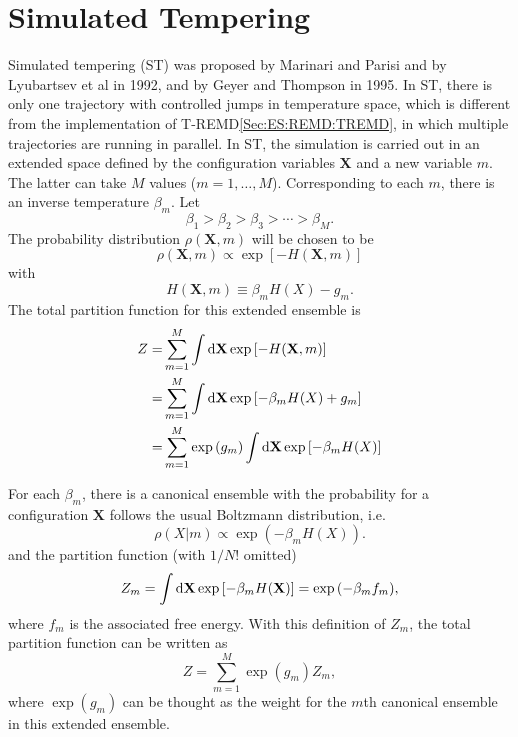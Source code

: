 \section{Simulated Tempering\label{Sec:ES:ST}}
Simulated tempering (ST) was proposed by Marinari and Parisi\cite{MarinariEPL1992} and by Lyubartsev et al\cite{LyubartsevJCP1992} in 1992, and by Geyer and Thompson\cite{GeyerJASA1995} in 1995. In ST, there is only one trajectory with controlled jumps in temperature space, which is different from the implementation of T-REMD\ref{Sec:ES:REMD:TREMD}, in which multiple trajectories are running in parallel. In ST, the simulation is carried out in an extended space defined by the configuration variables $\mathbf{X}$ and a new variable $m$. The latter can take $M$ values ($m=1,\dots,M$). Corresponding to each $m$, there is an inverse temperature $\beta_m$. Let
\begin{equation}
    \beta_1>\beta_2>\beta_3>\cdots >\beta_M.
\end{equation}
The probability distribution $\rho(\mathbf{X},m)$ will be chosen to be 
\begin{equation}
  \rho(\mathbf{X},m)\propto \exp{\left[-H(\mathbf{X},m)\right]}
\end{equation}
with 
\begin{equation}
  H(\mathbf{X},m)\equiv \beta_m H(X)-g_m.
\end{equation}
The total partition function for this extended ensemble is
\begin{align}
    Z=&\sum_{m=1}^M \int\mathop{}\!\mathrm{d} \mathbf{X} \exp{\left[-H(\mathbf{X},m)\right]}\notag\\
     =&\sum_{m=1}^M \int\mathop{}\!\mathrm{d} \mathbf{X} \exp{\left[-\beta_m H(X)+g_m\right]}\notag\\
     =&\sum_{m=1}^M \exp{(g_m)}\int\mathop{}\!\mathrm{d} \mathbf{X} \exp{\left[-\beta_m H(X)\right]}
\end{align}

For each $\beta_m$, there is a canonical ensemble with the probability for a configuration $\mathbf{X}$ follows the usual Boltzmann distribution, i.e. 
\begin{equation}
    \rho(X|m)\propto \exp{(-\beta_m H(X))}.
\end{equation}
and the partition function (with $1/N!$ omitted)
\begin{equation}
    Z_m=\int \mathop{}\!\mathrm{d} \mathbf{X} \exp{[-\beta_m H(\mathbf{X})]}=\exp{(-\beta_m f_m)},
\end{equation}
where $f_m$ is the associated free energy. With this definition of $Z_m$, the total partition function can be written as
\begin{equation}
    Z=\sum_{m=1}^M \exp{(g_m)} Z_m,
\end{equation}
where $\exp{(g_m)}$ can be thought as the weight for the $m$th canonical ensemble in this extended ensemble.

